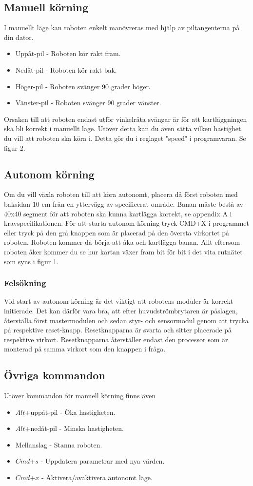 \documentclass[a4paper,12pt,fleqn]{article}
\begin{document}
\subsection{Manuell körning}
I manuellt läge kan roboten enkelt manövreras med hjälp av piltangenterna på din dator.
\begin{itemize}
	\item Uppåt-pil - Roboten kör rakt fram.
	\item Nedåt-pil - Roboten kör rakt bak.
	\item Höger-pil - Roboten svänger 90 grader höger.
	\item Vänster-pil - Roboten svänger 90 grader vänster.
\end{itemize}
Orsaken till att roboten endast utför vinkelräta svängar är för att kartläggningen ska bli korrekt i manuellt läge. Utöver detta kan du även sätta vilken hastighet du vill att roboten ska köra i. Detta gör du i reglaget "speed" i programvaran. Se figur 2. 
	
\subsection{Autonom körning}
Om du vill växla roboten till att köra autonomt, placera då först roboten med baksidan 10 cm från en yttervägg av specificerat område. Banan måste bestå av 40x40 segment för att roboten ska kunna kartlägga korrekt, se appendix A i kravspecifikationen. För att starta autonom körning tryck CMD+X i programmet eller tryck på den grå knappen som är placerad på den översta virkortet på roboten. Roboten kommer då börja att åka och kartlägga banan. Allt eftersom roboten åker kommer du se hur kartan växer fram bit för bit i det vita rutnätet som syns i figur 1. 

\subsubsection{Felsökning}
Vid start av autonom körning är det viktigt att robotens moduler är korrekt initierade. Det kan därför vara bra, att efter huvudströmbrytaren är påslagen, återställa först mastermodulen och sedan styr- och sensormodul genom att trycka på respektive reset-knapp. Resetknapparna är svarta och sitter placerade på respektive virkort. Resetknapparna återställer endast den processor som är monterad på samma virkort som den knappen i fråga.

\subsection{Övriga kommandon}
Utöver kommandon för manuell körning finns även
\begin{itemize}
	\item $Alt$+uppåt-pil - Öka hastigheten.
	\item $Alt$+nedåt-pil - Minska hastigheten.
	\item Mellanslag - Stanna roboten.
	\item $Cmd$+$s$ - Uppdatera parametrar med nya värden.
	\item $Cmd$+$x$ - Aktivera/avaktivera autonomt läge.
\end{itemize}
\end{document}
